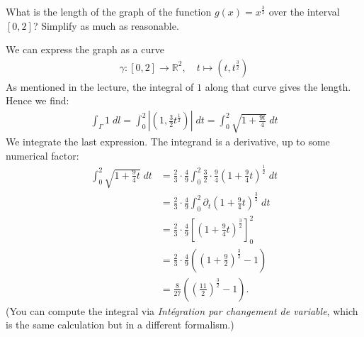 \documentclass[11pt]{article}
\begin{document}
\begin{exercise}
    What is the length of the graph of the function $g(x) = x^{\frac 3 2}$ over the interval $[0,2]$?
    Simplify as much as reasonable.
\end{exercise}
\begin{solution}
    We can express the graph as a curve 
    \begin{align*}
        \gamma : [0,2] \to \mathbb R^2, \quad t \mapsto ( t, t^{\frac 3 2} ) 
    \end{align*}
    As mentioned in the lecture, the integral of $1$ along that curve gives the length.
	Hence we find:
    \begin{align*}
        \int_\Gamma 1 \;dl = \int_0^2 \left| \left( 1, \frac 3 2 t^{\frac 1 2} \right) \right| \;dt = \int_0^2 \sqrt{ 1 + \frac{9t}{4} } \;dt
    \end{align*}
    We integrate the last expression. The integrand is a derivative, up to some numerical factor:
    \begin{align*}
        \int_0^2 \sqrt{ 1 + \frac 9 4 t } \;dt 
        &= 
        \frac 2 3 \cdot \frac 4 9 \int_0^2 \frac 3 2 \cdot \frac 9 4 \left( 1 + \frac 9 4 t \right)^{\frac 1 2} \;dt 
        \\&= 
        \frac 2 3 \cdot \frac 4 9 \int_0^2 \partial_t \left( 1 + \frac 9 4 t \right)^{\frac 3 2} \;dt 
        \\&= 
        \frac 2 3 \cdot \frac 4 9 \left[ \left( 1 + \frac 9 4 t \right)^{\frac 3 2} \right]_0^2
        \\&= 
        \frac 2 3 \cdot \frac 4 9 \left( \left( 1 + \frac 9 2 \right)^{\frac 3 2} - 1 \right)
        \\&= 
        \frac{8}{27} \left( \left( \frac {11} 2 \right)^{\frac 3 2} - 1 \right)
        .
    \end{align*}
    (You can compute the integral via \textit{Intégration par changement de variable}, 
	which is the same calculation but in a different formalism.)
\end{solution}
\end{document}
